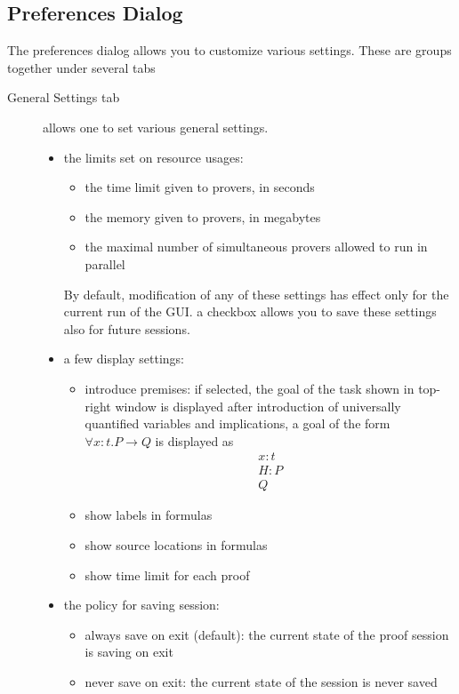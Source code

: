 \subsection{Preferences Dialog}

The preferences dialog allows you to customize various settings. These
are groups together under several tabs

\begin{description}
\item[\textsf{General Settings} tab] allows one to set
  various general settings.
\begin{itemize}
\item the limits set on resource usages:
  \begin{itemize}
  \item the time limit given to provers, in seconds
  \item the memory given to provers, in megabytes
  \item the maximal number of simultaneous provers allowed to run in parallel
  \end{itemize}
  By default, modification of any of these settings has effect only
  for the current run of the GUI. a checkbox allows you to save these
  settings also for future sessions.
\item a few display settings:
  \begin{itemize}
  \item introduce premises: if selected, the goal of the task shown in
    top-right window is displayed after introduction of universally
    quantified variables and implications, \eg a goal of the form
    $\forall x: t. P \rightarrow Q$ is displayed as
    \[
    \begin{array}{l}
      x : t \\
      H : P \\
      \hline
      Q
    \end{array}
    \]
  \item show labels in formulas
  \item show source locations in formulas
  \item show time limit for each proof
  \end{itemize}
\item the policy for saving session:
  \begin{itemize}
  \item always save on exit (default): the current state of the proof session is saving on exit
  \item never save on exit: the current state of the session is never saved

\end{itemize}
\end{itemize}
\end{description}
